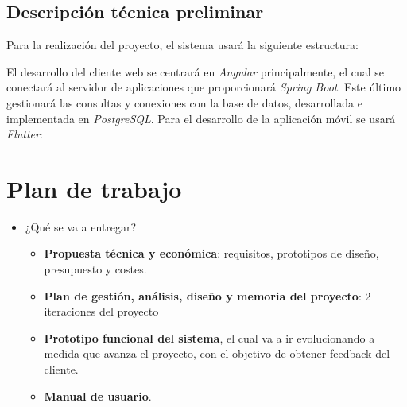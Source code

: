 \documentclass{article}
\begin{document}
\newpage
\subsection{Descripción técnica preliminar}
Para la realización del proyecto, el sistema usará la siguiente estructura: \vspace{0.15cm}

\begin{figure}[H]
\end{figure}
\vspace{0.15cm}

El desarrollo del cliente web se centrará en \textit{Angular} principalmente, el cual se conectará al servidor de aplicaciones que proporcionará \textit{Spring Boot}. Este último gestionará las consultas y conexiones con la base de datos, desarrollada e implementada en \textit{PostgreSQL}.
Para el desarrollo de la aplicación móvil se usará \textit{Flutter}:
\begin{figure}[H]
\end{figure}
\newpage

\section{Plan de trabajo}
\begin{itemize}
	\item ¿Qué se va a entregar?
	\begin{itemize}
		\item \textbf{Propuesta técnica y económica}: requisitos, prototipos de diseño, presupuesto y costes.
		\item \textbf{Plan de gestión, análisis, diseño y memoria del proyecto}: 2 iteraciones del proyecto
		\item \textbf{Prototipo funcional del sistema}, el cual va a ir evolucionando a medida que avanza el proyecto, con el objetivo de obtener feedback del cliente.
		\item \textbf{Manual de usuario}.
	\end{itemize}
\end{itemize}
\end{document}
